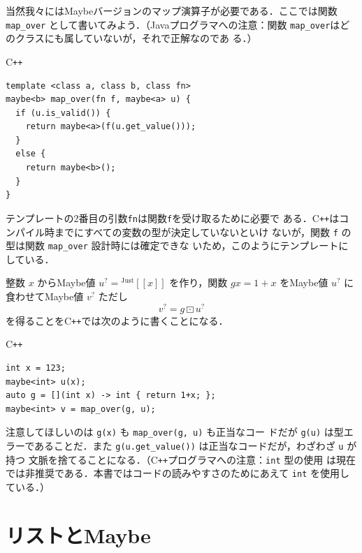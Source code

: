\documentclass[a5paper,twoside,fleqn,draft]{jsbook}
\def\[{[\![}
\def\]{]\!]}
\newcommand{\programminglanguage}[1]{\textsf{#1}}
\newcommand{\cxx}{\programminglanguage{C}\texttt{++}}
\newcommand{\cxxzerothree}{\cxx\programminglanguage{03}}
\newcommand{\java}{\programminglanguage{Java}}
\newcommand{\code}[1]{\texttt{#1}}
\newenvironment{cxxcode}{\begin{itembox}[r]{\cxx}}{\end{itembox}}
\DeclareMathOperator{\mMapMaybe}{\boxdot}
\newcommand{\mValueConstructor}[1]{\mathrm{#1}}
\newcommand{\mValueWith}[2]{{}^\mValueConstructor{#1}\[#2\]}
\newcommand{\mJustWith}[1]{\mValueWith{Just}{#1}}
\newcommand{\mMaybe}[1]{{#1}^?}
\begin{document}
当然我々にはMaybeバージョンのマップ演算子が必要である．ここでは関数
\code{map\_over} として書いてみよう．（\java プログラマへの注意：関数
  \code{map\_over}はどのクラスにも属していないが，それで正解なのであ
  る．）
\begin{cxxcode}
\begin{verbatim}
template <class a, class b, class fn>
maybe<b> map_over(fn f, maybe<a> u) {
  if (u.is_valid()) {
    return maybe<a>(f(u.get_value()));
  }
  else {
    return maybe<b>();
  }
}
\end{verbatim}
\end{cxxcode}
テンプレートの2番目の引数\code{fn}は関数\code{f}を受け取るために必要で
ある．\cxx はコンパイル時までにすべての変数の型が決定していないといけ
ないが，関数 \code{f} の型は関数 \code{map\_over} 設計時には確定できな
いため，このようにテンプレートにしている．

整数 $x$ からMaybe値 $\mMaybe{u}=\mJustWith{x}$ を作り，関数 $gx=1+x$
をMaybe値 $\mMaybe{u}$ に食わせてMaybe値 $\mMaybe{v}$ ただし
\begin{equation}
  \mMaybe{v}
  =g\mMapMaybe\mMaybe{u}
\end{equation}
を得ることを\cxx では次のように書くことになる．
\begin{cxxcode}
\begin{verbatim}
int x = 123;
maybe<int> u(x);
auto g = [](int x) -> int { return 1+x; };
maybe<int> v = map_over(g, u);
\end{verbatim}
\end{cxxcode}
注意してほしいのは \code{g(x)} も \code{map\_over(g, u)} も正当なコー
ドだが \code{g(u)} は型エラーであることだ．また
\code{g(u.get\_value())} は正当なコードだが，わざわざ \code{u} が持つ
文脈を捨てることになる．（\cxx プログラマへの注意：\code{int} 型の使用
は現在では非推奨である．本書ではコードの読みやすさのためにあえて
\code{int} を使用している．）


\section{リストとMaybe}
\end{document}
